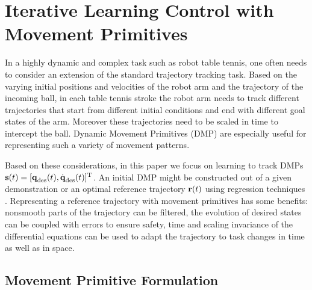 \section{Iterative Learning Control with Movement Primitives}\label{method}

In a highly dynamic and complex task such as robot table tennis, one often needs to consider an extension of the standard trajectory tracking task. Based on the varying initial positions and velocities of the robot arm and the trajectory of the incoming ball, in each table tennis stroke the robot arm needs to track different trajectories that start from different initial conditions and end with different goal states of the arm. Moreover these trajectories need to be scaled in time to intercept the ball. Dynamic Movement Primitives (DMP) are especially useful for representing such a variety of movement patterns.


Based on these considerations, in this paper we focus on learning to track DMPs $\boldsymbol{\mathrm{s}}(t) = [\boldsymbol{\mathrm{q}}_{\text{des}}(t),\dot{\boldsymbol{\mathrm{q}}}_{\text{des}}(t)]^{\mathrm{T}}$. An initial DMP might be constructed out of a given demonstration or an optimal reference trajectory $\boldsymbol{\mathrm{r}}(t)$ using regression techniques \cite{Ijspeert13}. Representing a reference trajectory with movement primitives has some benefits: nonsmooth parts of the trajectory can be filtered, the evolution of desired states can be coupled with errors to ensure safety, time and scaling invariance of the differential equations can be used to adapt the trajectory to task changes in time as well as in space. %

\subsection{Movement Primitive Formulation}

